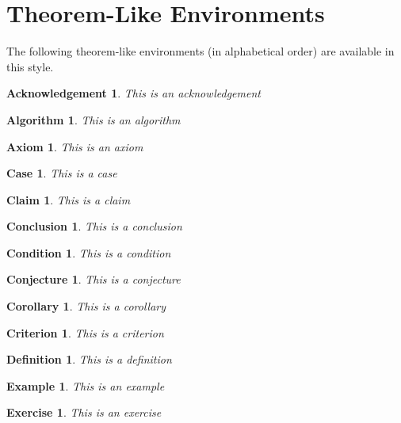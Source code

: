 \documentclass[letterpaper,12pt,openany,reqno]{book}%
\newtheorem{acknowledgement}[theorem]{Acknowledgement}
\newtheorem{algorithm}[theorem]{Algorithm}
\newtheorem{axiom}[theorem]{Axiom}
\newtheorem{case}[theorem]{Case}
\newtheorem{claim}[theorem]{Claim}
\newtheorem{conclusion}[theorem]{Conclusion}
\newtheorem{condition}[theorem]{Condition}
\newtheorem{conjecture}[theorem]{Conjecture}
\newtheorem{corollary}[theorem]{Corollary}
\newtheorem{criterion}[theorem]{Criterion}
\newtheorem{definition}[theorem]{Definition}
\newtheorem{example}[theorem]{Example}
\newtheorem{exercise}[theorem]{Exercise}
\begin{document}
\section{Theorem-Like Environments}

The following theorem-like environments (in alphabetical order) are available
in this style.

\begin{acknowledgement}
This is an acknowledgement
\end{acknowledgement}

\begin{algorithm}
This is an algorithm
\end{algorithm}

\begin{axiom}
This is an axiom
\end{axiom}

\begin{case}
This is a case
\end{case}

\begin{claim}
This is a claim
\end{claim}

\begin{conclusion}
This is a conclusion
\end{conclusion}

\begin{condition}
This is a condition
\end{condition}

\begin{conjecture}
This is a conjecture
\end{conjecture}

\begin{corollary}
This is a corollary
\end{corollary}

\begin{criterion}
This is a criterion
\end{criterion}

\begin{definition}
This is a definition
\end{definition}

\begin{example}
This is an example
\end{example}

\begin{exercise}
This is an exercise
\end{exercise}
\end{document}

